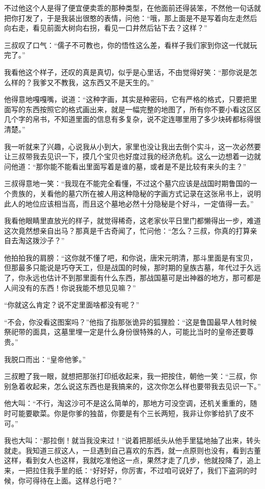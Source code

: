 不过他这个人是得了便宜便卖乖的那种类型，在他面前还得装笨，不然他一句话就把你打发了，于是我装出很憨的表情，问他：“哦，那上面是不是写着向左走然后向右走，看见前面大树向右拐，看见一口井然后钻下去？这样？”

三叔叹了口气：“儒子不可教也，你的悟性这么差，看样子我们家到你这一代就玩完了。”

我看他这个样子，还叹的真是真切，似乎是心里话，不由觉得好笑：“那你说是怎么样的？我爹又不教我，这东西又不是天生的。”

他得意地嘎嘎嘴，说道：“这种字画，其实是种密码，它有严格的格式，只要把里面写的东西按照它的格式画出来，就是一幅完整的地图了，所有你不要小看这区区几个字的帛书，不知道里面的信息有多复杂，说不定连哪里用了多少块砖都标得很清楚。”

我一听就来了兴趣，心说我从小到大，家里也没让我出去倒个实斗，这一次必然要让三叔带我去见识一下，摸几个宝贝也好度过我的经济危机。这么一边想着一边就问他道：“那你能不能看出里面写着是谁的墓，或者是不是比较有来头的主？”

三叔得意地一笑：“我现在不能完全看懂，不过这个墓穴应该是战国时期鲁国的一个贵族的，关看他的墓穴所在被人用这种隐秘的字画方式记录在这张帛书上，说明此人的地位应该相当高，而且这个墓地必然十分隐秘是个好斗，一定值得一去。”

我看他眼睛里直放光的样子，就觉得稀奇，这老家伙平日里门都懒得出一步，难道这次竟然想亲自出马？那真是千古奇闻了，忙问他：“怎么？三叔，你真的打算亲自去淘这拨沙子？”

他拍拍我的肩膀：“这你就不懂了吧，和你说，唐宋元明清，那斗里面是有宝贝，但那最多只能说是巧夺天工，但是战国的时候，那时期的皇族古墓，年代过于久远了，你永远也估计不到那里面有什么东西，那战国墓可是出神器的地方，那可都是人间没有的东西！你说我能不想见见嘛？”

“你就这么肯定？说不定里面啥都没有呢？”

“不会，你没看这图案吗？”他指了指那张诡异的狐狸脸：“这是鲁国最早人牲时候祭祀带的面具，这墓里埋一定是什么身份很特殊的人，可能比当时的皇帝还要尊贵。”

我脱口而出：“皇帝他爹。”

三叔瞪了我一眼，就想把那张打印纸收起来，我一把按住，朝他一笑：“三叔，你别急着收起来，怎么说这东西也是我搞来的，这次你怎么样也要带我去见识一下。”

他大叫：“不行，淘这沙可不是这么简单的，那地方可没空调，还机关重重的，随时可能要歇菜。你是你爹的独苗，你要是有个三长两短，我非让你爹给扒了皮不可。”

我也大叫：“那拉倒！就当我没来过！”说着把那纸头从他手里猛地抽了出来，转头就走。我知道三叔这人，一旦遇到自己喜欢的东西，就一点原则也没有，看到古董这样，看到女人也这样，我就吃准他这一点，果然才走了几步，他就投降了，追上来，一把拉住我手里的纸：“好好好，你厉害，不过咱可说好了，我们下盗洞的时候，你可得待在上面。这样总行吧？”

